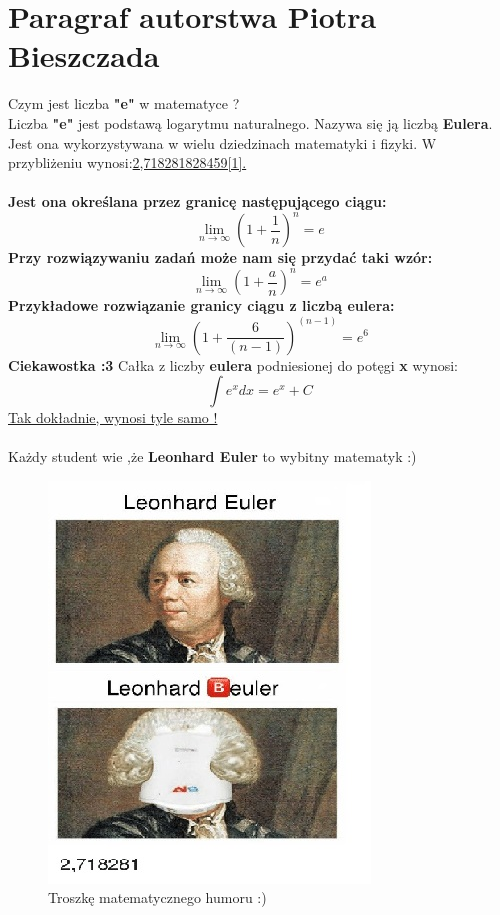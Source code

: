 
\section {Paragraf autorstwa Piotra Bieszczada}
Czym jest liczba \textbf{"e"} w matematyce ?
\\
Liczba \textbf{"e"} jest podstawą logarytmu naturalnego. Nazywa się ją liczbą \textbf{Eulera}. Jest ona wykorzystywana w wielu dziedzinach matematyki i fizyki. W przybliżeniu wynosi:\underline{2,718281828459[1].}
\\
\\
\textbf{Jest ona określana przez granicę następującego ciągu:}
    \begin{equation} \label{eq:1}
        \lim_{n \to \infty }\left({1+\frac{1}{n}}\right)^n=e
    \end{equation}
\textbf{Przy rozwiązywaniu zadań może nam się przydać taki wzór:}
    \begin{equation} \label{eq:2}
        \lim_{n \to \infty }\left({1+\frac{a}{n}}\right)^n=e^a
    \end{equation}
\textbf{Przykładowe rozwiązanie granicy ciągu z liczbą eulera:}
    \begin{equation} \label{eq:3}
        \lim_{n \to \infty }\left({1+\frac{6}{(n-1)}}\right)^{(n-1)}=e^6
    \end{equation}
\textbf{Ciekawostka :3} Całka z liczby \textbf{eulera} podniesionej do potęgi \textbf{x} wynosi:
    \begin{equation} \label{ex:4}
       \int{e^x}dx={e^x}+C
    \end{equation}
\underline{Tak dokładnie, wynosi tyle samo !}
\\
\\
Każdy student wie ,że \textbf{Leonhard Euler} to wybitny matematyk :)
\begin{figure}[htbp]
    \centering
    \includegraphics{pictures/leonhar_euler.jpg}
    \caption{Troszkę matematycznego humoru :)}
    \label{fig:my_label}
\end{figure}
